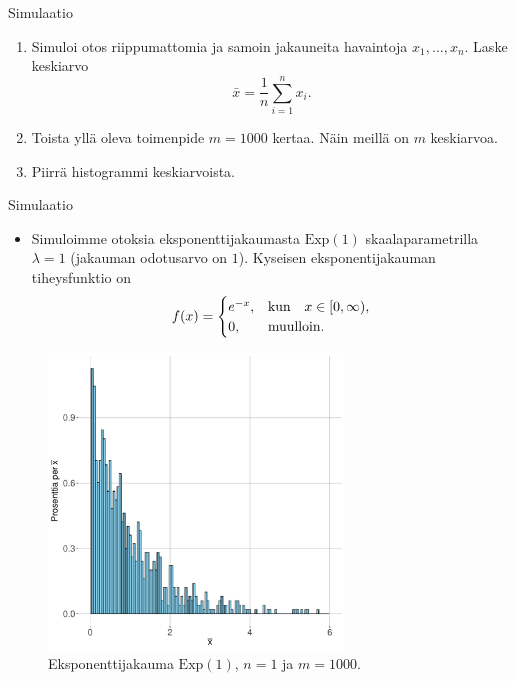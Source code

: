 \documentclass{beamer}
\begin{document}

\begin{frame}{Simulaatio}
  \begin{enumerate}
    \item Simuloi otos riippumattomia ja samoin jakauneita havaintoja $x_1,
    \ldots, x_n$. Laske keskiarvo
    \begin{equation*}
      \bar x = \frac{1}{n}\sum_{i=1}^n x_i.
    \end{equation*}
    \pause
    \item Toista yllä oleva toimenpide $m = 1000$ kertaa. Näin meillä on $m$
    keskiarvoa.
    \pause
    \item Piirrä histogrammi keskiarvoista.
  \end{enumerate}
\end{frame}


\begin{frame}{Simulaatio}
  \begin{itemize}
    \item Simuloimme otoksia eksponenttijakaumasta $\mathrm{Exp}(1)$
    skaalaparametrilla $\lambda = 1$ (jakauman odotusarvo on $1$). Kyseisen
    eksponentijakauman tiheysfunktio on
    \begin{equation*}
      f(x) =
      \begin{cases}
        e^{-x}, &\textnormal{kun}\quad x\in[0,\infty), \\
        0, &\textnormal{muulloin}. 
      \end{cases}
    \end{equation*}
  \end{itemize}
\end{frame}


\begin{frame}
  \begin{center}
    \begin{figure}
      \includegraphics[width=0.7\textwidth, height=0.7\textwidth]{exp-n-1.pdf}
      \caption{Eksponenttijakauma $\mathrm{Exp}\left(1\right)$, $n = 1$ ja $m = 1000$.}
  \end{figure}
\end{center}
\end{frame}
\end{document}
